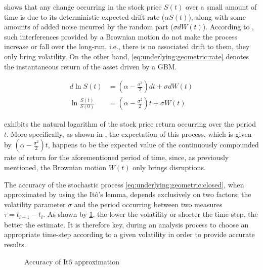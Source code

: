 \documentclass[12pt]{report}
\newcommand{\Bm}{W\left(t\right)}
\newcommand{\St}{S\left(t\right)}
\begin{document}
 shows that any change occurring in the stock price $S(t)$ over a small amount of time is due to its deterministic expected drift rate ($\alpha \St$), along with some amounts of added noise incurred by the random part ($\sigma d\Bm$). 
According to \citet{shreve}, such interferences provided by a Brownian motion do not make the process increase or fall over the long-run, i.e., there is no associated drift to them, they only bring volatility.
On the other hand, \cref{eq:underlying:geometric:rate} denotes the instantaneous return of the asset driven by a GBM.

\begin{align}
  d\ln{\St} &= (\alpha - \frac{\sigma ^2}{2}) dt 
              + \sigma d\Bm \label{eq:underlying:logreturn:diff} \\
  \ln{\frac{\St}{S(0)}} &= (\alpha - \frac{\sigma ^2}{2}) t 
              + \sigma \Bm \label{eq:underlying:log:return}
\end{align}

 exhibits the natural logarithm of the stock price return occurring over the period $t$. 
More specifically,  as shown in \citet{hull}, the expectation of this process, which is given by $(\alpha - \frac{\sigma ^2}{2})  t$, happens to be the expected value of the continuously compounded rate of return for the aforementioned period of time, since, as previously mentioned, the Brownian motion $\Bm$ only brings disruptions.


The accuracy of the stochastic process \ref{eq:underlying:geometric:closed}, when approximated by using the Itô's lemma, depends exclusively on two factors; the volatility parameter $\sigma$ and the period occurring between two measures $\tau = t_{i+1} - t_i$. 
As shown by \cref{p:itoaccuracy}, the lower the volatility or shorter the time-step, the better the estimate.
It is therefore key, during an analysis process to choose an appropriate time-step according to a given volatility in order to provide accurate results.


\begin{figure}[h]
\centering

\caption{Accuracy of Itô approximation}
\label{p:itoaccuracy}
\end{figure}
\end{document}
